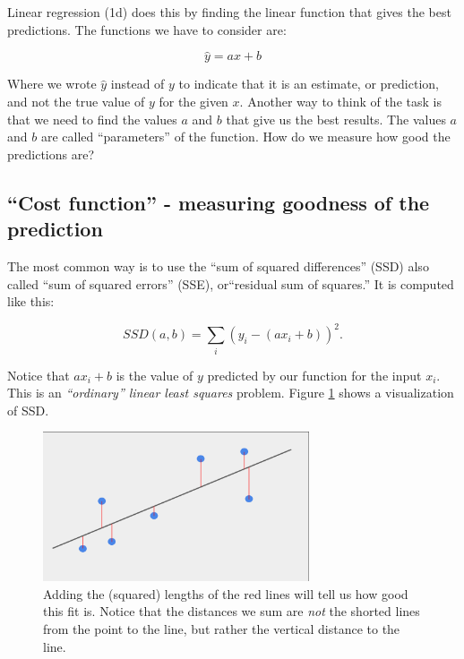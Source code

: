 \documentclass[11pt]{article}
\begin{document}
Linear regression (1d) does this by finding the linear function that
gives the best predictions.  The functions we have to consider are:

\begin{equation}
    \hat{y} = ax + b
\end{equation}

Where we wrote $\hat{y}$ instead of $y$ to indicate that it is an
estimate, or prediction, and not the true value of $y$ for the given
$x$. Another way to think of the task is that we need to  find the
values $a$ and $b$ that give us the best results. The values $a$ and $b$
are called ``parameters'' of the function.  How do we measure how good
the predictions are?

\subsection{``Cost function'' - measuring goodness of the prediction}

The most common way is to use the ``sum of squared differences'' (SSD) also
called ``sum of squared errors'' (SSE), or``residual sum of squares.''
It is computed like this:

\begin{equation}
    SSD(a,b) = \sum_i (y_i - (ax_i + b))^2.
\end{equation}

Notice that $ax_i +b$ is the value of $y$ predicted by our function for the
input $x_i$.  This is an \emph{``ordinary'' linear least squares} problem.
Figure \ref{fig:ssd} shows a visualization of SSD. 

\begin{figure}[h]
    \includegraphics[width=0.7\textwidth]{SSD.png}
    \centering
    \caption{Adding the (squared) lengths of the red lines will tell us
    how good this fit is.  Notice that the distances we sum are
    \emph{not} the shorted lines from the point to the line, but rather
    the vertical distance to the line. }
    \label{fig:ssd}
\end{figure}
\end{document}
